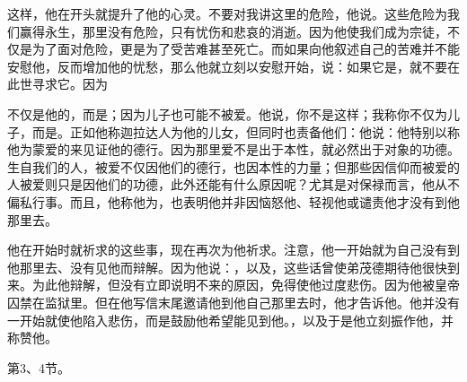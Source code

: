 \par

这样，他在开头就提升了他的心灵。不要对我讲这里的危险，他说。这些危险为我们赢得永生，那里没有危险，只有忧伤和悲哀的消逝。因为他使我们成为宗徒，不仅是为了面对危险，更是为了受苦难甚至死亡。而如果向他叙述自己的苦难并不能安慰他，反而增加他的忧愁，那么他就立刻以安慰开始，说：如果它是，就不要在此世寻求它。因为\par

\par

不仅是他的，而是；因为儿子也可能不被爱。他说，你不是这样；我称你不仅为儿子，而是。正如他称迦拉达人为他的儿女，但同时也责备他们：他说：他特别以称他为蒙爱的来见证他的德行。因为那里爱不是出于本性，就必然出于对象的功德。生自我们的人，被爱不仅因他们的德行，也因本性的力量；但那些因信仰而被爱的人被爱则只是因他们的功德，此外还能有什么原因呢？尤其是对保禄而言，他从不偏私行事。而且，他称他为，也表明他并非因恼怒他、轻视他或谴责他才没有到他那里去。\par

\par

他在开始时就祈求的这些事，现在再次为他祈求。注意，他一开始就为自己没有到他那里去、没有见他而辩解。因为他说：，以及，这些话曾使弟茂德期待他很快到来。为此他辩解，但没有立即说明不来的原因，免得使他过度悲伤。因为他被皇帝囚禁在监狱里。但在他写信末尾邀请他到他自己那里去时，他才告诉他。他并没有一开始就使他陷入悲伤，而是鼓励他希望能见到他。，以及于是他立刻振作他，并称赞他。\par

第3、4节。\par

